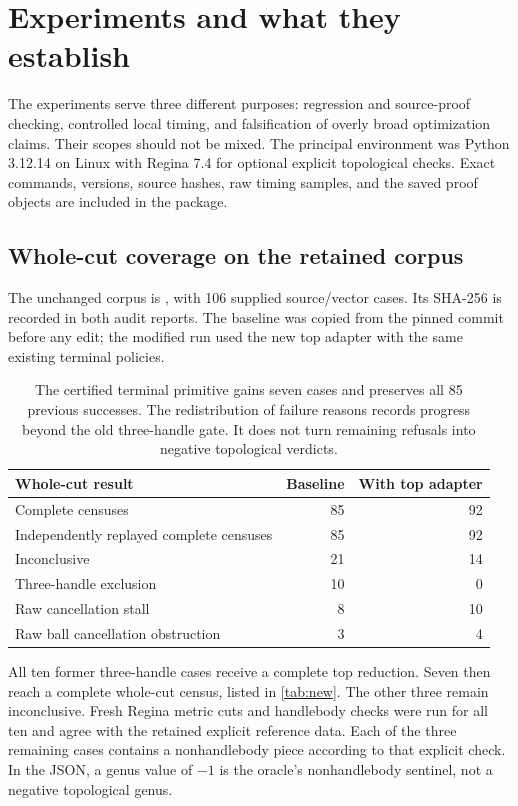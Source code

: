 \section{Experiments and what they establish}
\label{sec:experiments}

The experiments serve three different purposes: regression and source-proof
checking, controlled local timing, and falsification of overly broad
optimization claims. Their scopes should not be mixed. The principal
environment was Python 3.12.14 on Linux with Regina 7.4 for optional explicit
topological checks. Exact commands, versions, source hashes, raw timing
samples, and the saved proof objects are included in the package.

\subsection{Whole-cut coverage on the retained corpus}

The unchanged corpus is
, with 106 supplied
source/vector cases. Its SHA-256 is recorded in both audit reports. The
baseline was copied from the pinned commit before any edit; the modified
run used the new top adapter with the same existing terminal policies.

\begin{table}[htbp]
\centering
\begin{tabular}{@{}lrr@{}}
\toprule
Whole-cut result & Baseline & With top adapter\\
\midrule
Complete censuses & 85 & 92\\
Independently replayed complete censuses & 85 & 92\\
Inconclusive & 21 & 14\\
Three-handle exclusion & 10 & 0\\
Raw cancellation stall & 8 & 10\\
Raw ball cancellation obstruction & 3 & 4\\
\bottomrule
\end{tabular}
\caption{The certified terminal primitive gains seven cases and preserves
 all 85 previous successes. The redistribution of failure reasons records
 progress beyond the old three-handle gate. It does not turn remaining
 refusals into negative topological verdicts.}
\label{tab:coverage}
\end{table}

All ten former three-handle cases receive a complete top reduction. Seven
then reach a complete whole-cut census, listed in \cref{tab:new}. The other
three remain inconclusive. Fresh Regina metric cuts and handlebody checks
were run for all ten and agree with the retained explicit reference data.
Each of the three remaining cases contains a nonhandlebody piece according
to that explicit check. In the JSON, a genus value of $-1$ is the oracle's
nonhandlebody sentinel, not a negative topological genus.

